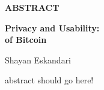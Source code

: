 \setcounter{page}{3}
\vspace*{1cm}
\begin{center}
{\bf ABSTRACT}
\end{center}
\begin{center}
{\bf Privacy and Usability:}\\
{\bf of Bitcoin}
\end{center}
\vspace*{0.2in}
\begin{center}
Shayan Eskandari
\end{center}


abstract should go here!



